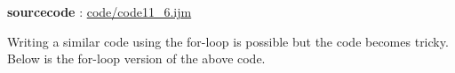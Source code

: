 \textbf{sourcecode} : \href{http://www.example.com/contents}{code/code11\_6.ijm}

Writing a similar code using the for-loop is possible but the code becomes tricky.
Below is the for-loop version of the above code.